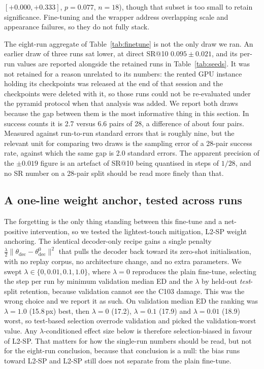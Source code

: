 \documentclass[fleqn,10pt]{wlscirep}
\begin{document}
$[+0.000,+0.333]$, $p=0.077$, $n=18$), though that subset is too small to retain significance. Fine-tuning and the wrapper address overlapping scale and appearance failures, so they do not fully stack.

The eight-run aggregate of Table~\ref{tab:finetune} is not the only draw we ran. An earlier draw of three runs sat lower, at direct SR@10 $0.095\pm0.021$, and its per-run values are reported alongside the retained runs in Table~\ref{tab:seeds}. It was not retained for a reason unrelated to its numbers: the rented GPU instance holding its checkpoints was released at the end of that session and the checkpoints were deleted with it, so those runs could not be re-evaluated under the pyramid protocol when that analysis was added. We report both draws because the gap between them is the most informative thing in this section. In success counts it is 2.7 versus 6.6 pairs of 28, a difference of about four pairs. Measured against run-to-run standard errors that is roughly nine, but the relevant unit for comparing two draws is the sampling error of a 28-pair success rate, against which the same gap is 2.0 standard errors. The apparent precision of the $\pm0.019$ figure is an artefact of SR@10 being quantised in steps of $1/28$, and no SR number on a 28-pair split should be read more finely than that.

\subsection*{A one-line weight anchor, tested across runs}

The forgetting is the only thing standing between this fine-tune and a net-positive intervention, so we tested the lightest-touch mitigation, L2-SP weight anchoring\cite{li2018l2sp}. The identical decoder-only recipe gains a single penalty $\tfrac{\lambda}{2}\lVert\theta_{\mathrm{dec}}-\theta_{\mathrm{dec}}^{0}\rVert^{2}$ that pulls the decoder back toward its zero-shot initialisation, with no replay corpus, no architecture change, and no extra parameters. We swept $\lambda\in\{0,0.01,0.1,1.0\}$, where $\lambda=0$ reproduces the plain fine-tune, selecting the step per run by minimum validation median ED and the $\lambda$ by held-out \emph{test}-split retention, because validation cannot see the C103 damage. This was the wrong choice and we report it as such. On validation median ED the ranking was $\lambda=1.0$ (15.8\,px) best, then $\lambda=0$ (17.2), $\lambda=0.1$ (17.9) and $\lambda=0.01$ (18.9) worst, so test-based selection overrode validation and picked the validation-worst value. Any $\lambda$-conditioned effect size below is therefore selection-biased in favour of L2-SP. That matters for how the single-run numbers should be read, but not for the eight-run conclusion, because that conclusion is a null: the bias runs toward L2-SP and L2-SP still does not separate from the plain fine-tune.
\end{document}
